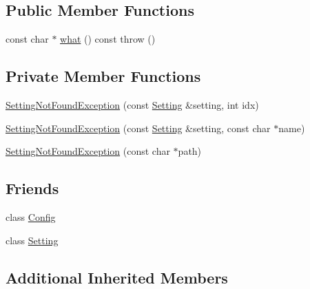 \subsection*{Public Member Functions}
\begin{DoxyCompactItemize}
\item 
const char $\ast$ \hyperlink{classlibconfig_1_1SettingNotFoundException_a10ddbf9dfba0e1d43e84ad9f746f4dc3}{what} () const   throw ()
\end{DoxyCompactItemize}
\subsection*{Private Member Functions}
\begin{DoxyCompactItemize}
\item 
\hyperlink{classlibconfig_1_1SettingNotFoundException_a6ee6e8926d797116f24f23c26d0ba915}{Setting\-Not\-Found\-Exception} (const \hyperlink{classlibconfig_1_1Setting}{Setting} \&setting, int idx)
\item 
\hyperlink{classlibconfig_1_1SettingNotFoundException_ad84a0a49ee86f381a845520e666ad8f6}{Setting\-Not\-Found\-Exception} (const \hyperlink{classlibconfig_1_1Setting}{Setting} \&setting, const char $\ast$name)
\item 
\hyperlink{classlibconfig_1_1SettingNotFoundException_ab08c153aa8ccc279b4802e447f5c0e63}{Setting\-Not\-Found\-Exception} (const char $\ast$path)
\end{DoxyCompactItemize}
\subsection*{Friends}
\begin{DoxyCompactItemize}
\item 
class \hyperlink{classlibconfig_1_1SettingNotFoundException_ac3da7e21a05bf8852638db7e4dd1b81a}{Config}
\item 
class \hyperlink{classlibconfig_1_1SettingNotFoundException_a9aa0bc1c3d297cabf9a1848178294d38}{Setting}
\end{DoxyCompactItemize}
\subsection*{Additional Inherited Members}


